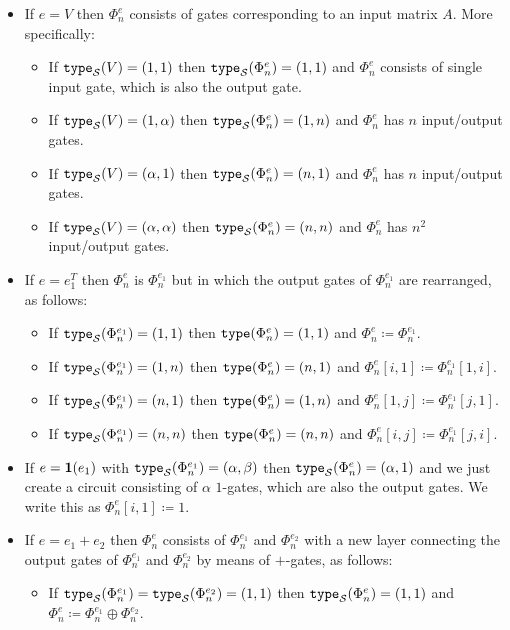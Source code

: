 \begin{itemize}
	\item
	If $e=V$ then $\Phi_n^e$ consists of gates corresponding to an input matrix $A$. More specifically:
\begin{itemize}
	\item If $\texttt{type}_{\mathcal{S}}(V)=(1,1)$ then $\texttt{type}_{\mathcal{S}}(\Phi^e_n)=(1,1)$ and $\Phi_n^e$ consists of single input gate, which is also
	the output gate.
	\item If $\texttt{type}_{\mathcal{S}}(V)=(1,\alpha)$ then $\texttt{type}_{\mathcal{S}}(\Phi^e_n)=(1,n)$ and $\Phi^e_n$ has $n$ input/output gates.
  \item If $\texttt{type}_{\mathcal{S}}(V)=(\alpha,1)$ then $\texttt{type}_{\mathcal{S}}(\Phi^e_n)=(n,1)$ and $\Phi^e_n$ has $n$ input/output gates.
	\item If $\texttt{type}_{\mathcal{S}}(V)=(\alpha,\alpha)$ then $\texttt{type}_{\mathcal{S}}(\Phi^e_n)=(n,n)$ and $\Phi^e_n$ has $n^2$ input/output gates. 
\end{itemize}
\item
If $e=e_1^T$ then $\Phi^e_n$ is $\Phi^{e_1}_n$ but in which the output gates of $\Phi_n^{e_1}$ are rearranged, as follows:
\begin{itemize}
	\item If $\texttt{type}_{\mathcal{S}}(\Phi^{e_1}_n)=(1, 1)$ then $\texttt{type}(\Phi^e_n)=(1,1)$ and $\Phi_n^e\coloneqq \Phi_n^{e_1}$.
	\item If $\texttt{type}_{\mathcal{S}}(\Phi^{e_1}_n)=(1, n)$ then $\texttt{type}(\Phi^e_n)=(n,1)$ and $\Phi^e_n[i,1]\coloneqq \Phi^{e_1}_n[1,i]$. 
  \item If $\texttt{type}_{\mathcal{S}}(\Phi^{e_1}_n)=(n, 1)$ then $\texttt{type}(\Phi^e_n)=(1,n)$ and $\Phi^e_n[1,j]\coloneqq \Phi^{e_1}_n[j,1]$. 
  \item If $\texttt{type}_{\mathcal{S}}(\Phi^{e_1}_n)=(n, n)$ then $\texttt{type}(\Phi^e_n)=(n,n)$ and $\Phi^e_n[i,j]\coloneqq \Phi^{e_1}_n[j,i]$. 
\end{itemize}
\item
If $e={\mathbf{1}}(e_1)$ with $\texttt{type}_{\mathcal{S}}(\Phi^{e_1}_n)=(\alpha,\beta)$ then $\texttt{type}_{\mathcal{S}}(\Phi^{e}_n)=(\alpha,1)$ and we just
create a circuit consisting of $\alpha$ $1$-gates, which are also the output gates. We write this as
$\Phi^e_n[i,1]\coloneqq 1$.
\item
If $e=e_1 + e_2$ then $\Phi_n^e$ consists of $\Phi_n^{e_1}$ and $\Phi_n^{e_2}$ with a new layer connecting the output gates of $\Phi_n^{e_1}$ and $\Phi_n^{e_2}$ by means
of $+$-gates, as follows:
\begin{itemize}
	\item If $\texttt{type}_{\mathcal{S}}(\Phi^{e_1}_n)=\texttt{type}_{\mathcal{S}}(\Phi^{e_2}_n)=(1, 1)$  then $\texttt{type}_{\mathcal{S}}(\Phi^{e}_n)=(1, 1)$ and $\Phi^e_n\coloneqq \Phi^{e_1}_n \oplus \Phi^{e_2}_n$.

\end{itemize}
\end{itemize}
